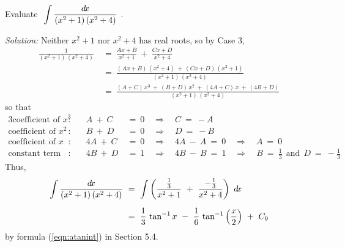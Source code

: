 \newpage
\begin{exmp}\label{exmp:partfrac4}
\noindent Evaluate $~\displaystyle\int \frac{d\!x}{(x^2+1)\,(x^2+4)}~$.\vspace{1mm}
\par\noindent\emph{Solution:} Neither $x^2 + 1$ nor $x^2 + 4$ has real roots,
so by Case 3,
\begin{align*}
\frac{1}{(x^2+1)\,(x^2+4)} ~&=~ \frac{Ax+B}{x^2+1} ~+~ \frac{Cx+D}{x^2+4}\\[4pt]
&=~ \frac{(Ax+B)\,(x^2+4) ~+~ (Cx+D)\,(x^2+1)}{(x^2+1)\,(x^2+4)}\\[4pt]
&=~ \frac{(A+C)\,x^3 ~+~ (B+D)\,x^2 ~+~ (4A+C)\,x ~+~ (4B+D)}{(x^2+1)\,(x^2+4)}
\end{align*}
so that
\begin{alignat*}{3}
\text{coefficient of $x^3$}&: \quad & A ~+~ C ~&=~ 0 \quad\Rightarrow\quad C ~=~ -A\\
\text{coefficient of $x^2$}&: \quad & B ~+~ D ~&=~ 0 \quad\Rightarrow\quad D ~=~ -B\\
\text{coefficient of $x$}&: \quad & 4A ~+~ C ~&=~ 0 \quad\Rightarrow\quad 4A ~-~ A ~=~ 0
 \quad\Rightarrow\quad A ~=~ 0\\
\text{constant term}&: & 4B ~+~ D ~&=~ 1 \quad\Rightarrow\quad 4B ~-~ B ~=~ 1
\quad\Rightarrow\quad B ~=~ \frac{1}{3} ~~\text{and}~~ D ~=~ -\frac{1}{3}
\end{alignat*}
Thus,
\begin{align*}
\int \frac{d\!x}{(x^2+1)\,(x^2+4)} ~&=~ \int \left(\frac{\frac{1}{3}}{x^2+1} ~+~
 \frac{-\frac{1}{3}}{x^2+4}\right)~d\!x\\[6pt]
&=~ \frac{1}{3}\,\tan^{-1} x ~-~ \frac{1}{6}\,\tan^{-1}\left(\frac{x}{2}\right) ~+~ C_0
\end{align*}
by formula (\ref{eqn:atanint}) in Section 5.4.
\end{exmp}
\divider
\vspace{2mm}

